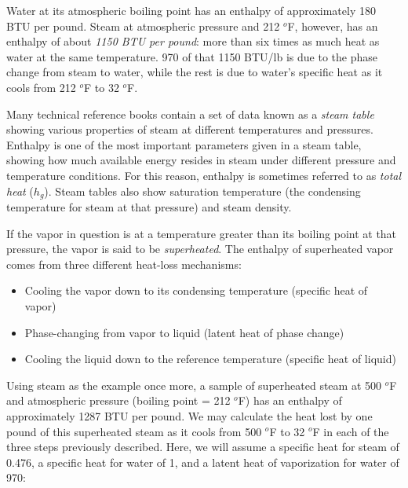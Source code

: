 Water at its atmospheric boiling point has an enthalpy of approximately 180 BTU per pound.  Steam at atmospheric pressure and 212 $^{o}$F, however, has an enthalpy of about \textit{1150 BTU per pound}: more than six times as much heat as water at the same temperature.  970 of that 1150 BTU/lb is due to the phase change from steam to water, while the rest is due to water's specific heat as it cools from 212 $^{o}$F to 32 $^{o}$F.

Many technical reference books contain a set of data known as a \textit{steam table} showing various properties of steam at different temperatures and pressures.  Enthalpy is one of the most important parameters given in a steam table, showing how much available energy resides in steam under different pressure and temperature conditions.  For this reason, enthalpy is sometimes referred to as \textit{total heat} ($h_g$).  Steam tables also show saturation temperature (the condensing temperature for steam at that pressure) and steam density.    

\filbreak

If the vapor in question is at a temperature greater than its boiling point at that pressure, the vapor is said to be \textit{superheated}.  The enthalpy of superheated vapor comes from three different heat-loss mechanisms: 

\begin{itemize}
\item Cooling the vapor down to its condensing temperature (specific heat of vapor)
\item Phase-changing from vapor to liquid (latent heat of phase change)
\item Cooling the liquid down to the reference temperature (specific heat of liquid)
\end{itemize}

\filbreak

Using steam as the example once more, a sample of superheated steam at 500 $^{o}$F and atmospheric pressure (boiling point = 212 $^{o}$F) has an enthalpy of approximately 1287 BTU per pound.  We may calculate the heat lost by one pound of this superheated steam as it cools from 500 $^{o}$F to 32 $^{o}$F in each of the three steps previously described.  Here, we will assume a specific heat for steam of 0.476, a specific heat for water of 1, and a latent heat of vaporization for water of 970:


